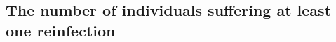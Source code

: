 \documentclass[preprint,12pt]{elsarticle}
\begin{document}

\subsection{The number of individuals suffering at least one reinfection}
\label{SubSect23}
\end{document}
